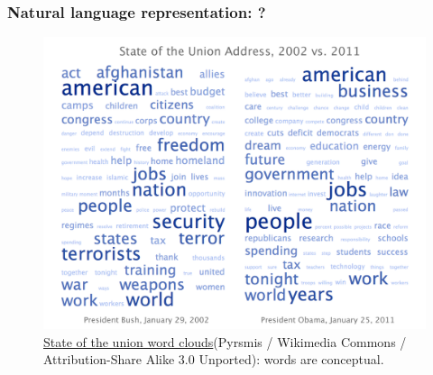 \documentclass{article}
\begin{document}
\subsubsection{Natural language representation: ?}
\begin{figure}[H]
	\centering
	\includegraphics[width=\linewidth]{State_of_the_union_word_clouds}
	\caption{ 
	\href{https://commons.wikimedia.org/wiki/File:State_of_the_union_word_clouds.png}{State
	 of the union word clouds}(Pyrsmis / Wikimedia Commons / Attribution-Share 
	Alike 3.0 Unported): words are conceptual.}
	\label{fig:State_of_the_union_word_clouds}
\end{figure}
\end{document}
